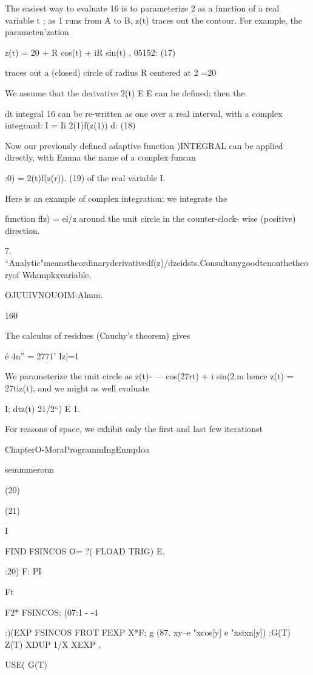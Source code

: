 The easiest way to evaluate 16 is to parameterize 2 as a function
of a real variable t ; as 1 runs from A to B, z(t) traces out the
contour. For example, the parameten'zation

z(t) = 20 + R cos(t) + iR sin(t) , 05152: (17)

traces out a (closed) circle of radius R centered at 2 =20

We assume that the derivative 2(t) E E can be deﬁned; then the

dt
integral 16 can be re-written as one over a real interval, with a
complex integrand:
I = Ii 2(1)f(z(1)) d: (18)

Now our previously defined adaptive function )INTEGRAL can
be applied directly, with Emma the name of a complex funcan

:0) = 2(t)f(z(r)). (19)
of the real variable I.

Here is an example of complex integration: we integrate the

function ﬂz) = el/z around the unit circle in the counter-clock-
wise (positive) direction.

 

7. “Analytic"meanstheordinaryderivativedf(z)/dzeidsts.Consultanygoodtenonthetheoryof
Wdampkxvariable.

OJUUIVNOUOIM-Almm.

160

The calculus of residues (Cauchy's theorem) gives

é 4n” = 2771'
Iz|=1

We parameterize the unit circle as z(t)- — cos(27rt) + i sin(2.m
hence z(t) = 27tiz(t), and we might as well evaluate

I; dtz(t) 21/2“) E 1.

For reasons of space, we exhibit only the first and last few iterationst

ChapterO-MoraProgrammIngEnmpIoa

semmmeronn

(20)

(21)

 

I

FIND FSINCOS O= ?( FLOAD TRIG) E.

:20) F: PI

Ft

F2* FSINCOS; (07:1 - -4

:)(EXP FSINCOS FROT FEXP X*F; g
(87. xy--e "xcos[y] e "xsixn[y])
:G(T) Z(T) XDUP 1/X XEXP ,

USE( G(T) %


